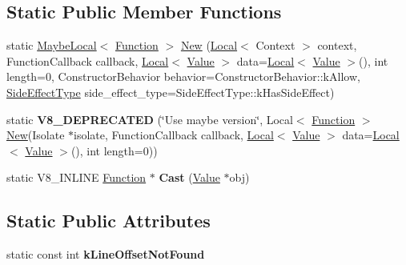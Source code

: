 \subsection*{Static Public Member Functions}
\begin{DoxyCompactItemize}
\item 
static \mbox{\hyperlink{classv8_1_1MaybeLocal}{Maybe\+Local}}$<$ \mbox{\hyperlink{classv8_1_1Function}{Function}} $>$ \mbox{\hyperlink{classv8_1_1Function_afc51cb2669c3f8b6035c2a7f813d0040}{New}} (\mbox{\hyperlink{classv8_1_1Local}{Local}}$<$ Context $>$ context, Function\+Callback callback, \mbox{\hyperlink{classv8_1_1Local}{Local}}$<$ \mbox{\hyperlink{classv8_1_1Value}{Value}} $>$ data=\mbox{\hyperlink{classv8_1_1Local}{Local}}$<$ \mbox{\hyperlink{classv8_1_1Value}{Value}} $>$(), int length=0, Constructor\+Behavior behavior=Constructor\+Behavior\+::k\+Allow, \mbox{\hyperlink{namespacev8_a29711319c2b9fc7716d65faee2f7b9cb}{Side\+Effect\+Type}} side\+\_\+effect\+\_\+type=Side\+Effect\+Type\+::k\+Has\+Side\+Effect)
\item 
\mbox{\label{classv8_1_1Function_a4ffb43746def98eb33536fa05bfecf16}} 
static {\bfseries V8\+\_\+\+D\+E\+P\+R\+E\+C\+A\+T\+ED} (\char`\"{}Use maybe version\char`\"{}, Local$<$ \mbox{\hyperlink{classv8_1_1Function}{Function}} $>$ \mbox{\hyperlink{classv8_1_1Function_afc51cb2669c3f8b6035c2a7f813d0040}{New}}(Isolate $\ast$isolate, Function\+Callback callback, \mbox{\hyperlink{classv8_1_1Local}{Local}}$<$ \mbox{\hyperlink{classv8_1_1Value}{Value}} $>$ data=\mbox{\hyperlink{classv8_1_1Local}{Local}}$<$ \mbox{\hyperlink{classv8_1_1Value}{Value}} $>$(), int length=0))
\item 
\mbox{\label{classv8_1_1Function_af24f38bcc0769519816cda1f6a154ff8}} 
static V8\+\_\+\+I\+N\+L\+I\+NE \mbox{\hyperlink{classv8_1_1Function}{Function}} $\ast$ {\bfseries Cast} (\mbox{\hyperlink{classv8_1_1Value}{Value}} $\ast$obj)
\end{DoxyCompactItemize}
\subsection*{Static Public Attributes}
\begin{DoxyCompactItemize}
\item 
\mbox{\label{classv8_1_1Function_acf0af24f79908e405a6ac435277596d9}} 
static const int {\bfseries k\+Line\+Offset\+Not\+Found}
\end{DoxyCompactItemize}


